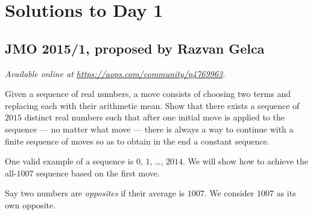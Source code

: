 \documentclass[11pt]{scrartcl}
\begin{document}
\section{Solutions to Day 1}
\subsection{JMO 2015/1, proposed by Razvan Gelca}
\textsl{Available online at \url{https://aops.com/community/p4769963}.}
\begin{mdframed}[style=mdpurplebox,frametitle={Problem statement}]
Given a sequence of real numbers,
a move consists of choosing two terms
and replacing each with their arithmetic mean.
Show that there exists a sequence of $2015$ distinct real numbers
such that after one initial move
is applied to the sequence --- no matter what move --- there
is always a way to continue with a finite sequence of moves
so as to obtain in the end a constant sequence.
\end{mdframed}
One valid example of a sequence is $0$, $1$, \dots, $2014$.
We will show how to achieve the all-$1007$ sequence
based on the first move.

Say two numbers are \emph{opposites} if their average is $1007$.
We consider $1007$ as its own opposite.
\end{document}
